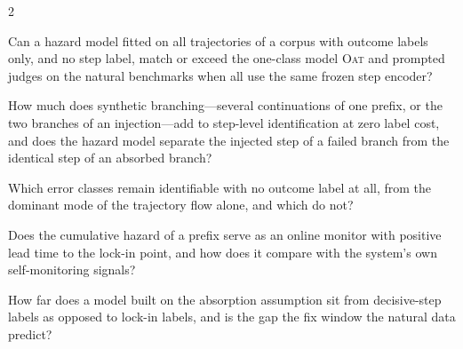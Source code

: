 \begin{rqbox}{2}
\begin{description}[leftmargin=3.2em,style=sameline,font=\bfseries,itemsep=1.5pt]
\item[RQ\,2.1] Can a hazard model fitted on all trajectories of a corpus with outcome labels only, and no step label, match or exceed the one-class model \textsc{Oat} and prompted judges on the natural benchmarks when all use the same frozen step encoder?
\item[RQ\,2.2] How much does synthetic branching---several continuations of one prefix, or the two branches of an injection---add to step-level identification at zero label cost, and does the hazard model separate the injected step of a failed branch from the identical step of an absorbed branch?
\item[RQ\,2.3] Which error classes remain identifiable with no outcome label at all, from the dominant mode of the trajectory flow alone, and which do not?
\item[RQ\,2.4] Does the cumulative hazard of a prefix serve as an online monitor with positive lead time to the lock-in point, and how does it compare with the system's own self-monitoring signals?
\item[RQ\,2.5] How far does a model built on the absorption assumption sit from decisive-step labels as opposed to lock-in labels, and is the gap the fix window the natural data predict?
\end{description}
\end{rqbox}

